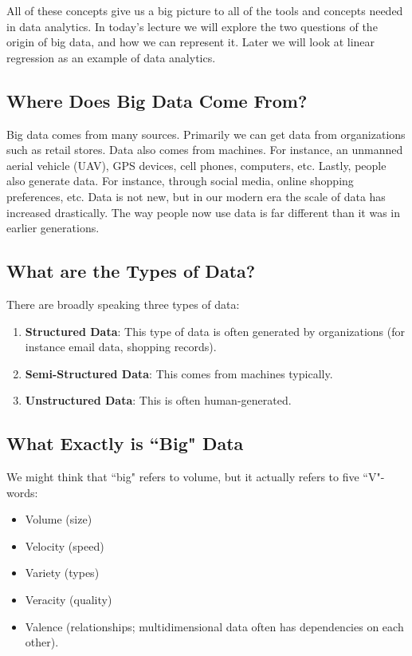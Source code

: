 \documentclass{article}
\begin{document}
\noindent All of these concepts give us a big picture to all of the tools and concepts needed in data analytics.  In today's lecture we will explore the two questions of the origin of big data, and how we can represent it.  Later we will look at linear regression as an example of data analytics.

\subsection{Where Does Big Data Come From?}

\noindent Big data comes from many sources.  Primarily we can get data from organizations such as retail stores.  Data also comes from machines.  For instance, an unmanned aerial vehicle (UAV), GPS devices, cell phones, computers, etc.  Lastly, people also generate data.  For instance, through social media, online shopping preferences, etc.  Data is not new, but in our modern era the scale of data has increased drastically.  The way people now use data is far different than it was in earlier generations.

\subsection{What are the Types of Data?}

\noindent There are broadly speaking three types of data:

\begin{enumerate}
\item \textbf{Structured Data}: This type of data is often generated by organizations (for instance email data, shopping records).

\item \textbf{Semi-Structured Data}: This comes from machines typically.
\item \textbf{Unstructured Data}: This is often human-generated.
\end{enumerate}

\subsection{What Exactly is ``Big" Data}

\noindent We might think that ``big" refers to volume, but it actually refers to five ``V"-words:

\begin{itemize}
\item Volume (size)
\item Velocity (speed)
\item Variety (types)
\item Veracity (quality)
\item Valence (relationships; multidimensional data often has dependencies on each other).
\end{itemize}
\end{document}

